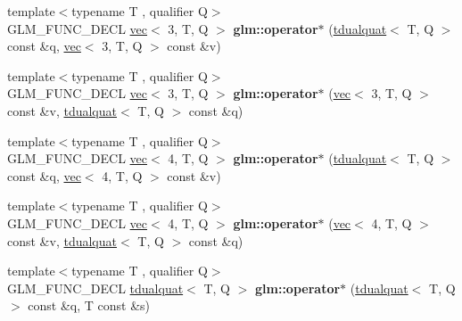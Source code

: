 \begin{DoxyCompactItemize}
{\footnotesize template$<$typename T , qualifier Q$>$ }\\G\+L\+M\+\_\+\+F\+U\+N\+C\+\_\+\+D\+E\+CL \hyperlink{structglm_1_1vec}{vec}$<$ 3, T, Q $>$ {\bfseries glm\+::operator$\ast$} (\hyperlink{structglm_1_1tdualquat}{tdualquat}$<$ T, Q $>$ const \&q, \hyperlink{structglm_1_1vec}{vec}$<$ 3, T, Q $>$ const \&v)
\item 
\mbox{\label{group__gtx__dual__quaternion_ga84dc00cb210525a28d3a185c9a0ba176}} 
{\footnotesize template$<$typename T , qualifier Q$>$ }\\G\+L\+M\+\_\+\+F\+U\+N\+C\+\_\+\+D\+E\+CL \hyperlink{structglm_1_1vec}{vec}$<$ 3, T, Q $>$ {\bfseries glm\+::operator$\ast$} (\hyperlink{structglm_1_1vec}{vec}$<$ 3, T, Q $>$ const \&v, \hyperlink{structglm_1_1tdualquat}{tdualquat}$<$ T, Q $>$ const \&q)
\item 
\mbox{\label{group__gtx__dual__quaternion_ga5e415497e00977106ec263f86b61e84c}} 
{\footnotesize template$<$typename T , qualifier Q$>$ }\\G\+L\+M\+\_\+\+F\+U\+N\+C\+\_\+\+D\+E\+CL \hyperlink{structglm_1_1vec}{vec}$<$ 4, T, Q $>$ {\bfseries glm\+::operator$\ast$} (\hyperlink{structglm_1_1tdualquat}{tdualquat}$<$ T, Q $>$ const \&q, \hyperlink{structglm_1_1vec}{vec}$<$ 4, T, Q $>$ const \&v)
\item 
\mbox{\label{group__gtx__dual__quaternion_ga9fd4e646fe49daed7aabbf0cb8736685}} 
{\footnotesize template$<$typename T , qualifier Q$>$ }\\G\+L\+M\+\_\+\+F\+U\+N\+C\+\_\+\+D\+E\+CL \hyperlink{structglm_1_1vec}{vec}$<$ 4, T, Q $>$ {\bfseries glm\+::operator$\ast$} (\hyperlink{structglm_1_1vec}{vec}$<$ 4, T, Q $>$ const \&v, \hyperlink{structglm_1_1tdualquat}{tdualquat}$<$ T, Q $>$ const \&q)
\item 
\mbox{\label{group__gtx__dual__quaternion_ga03c35eae969f074f10fa2bf473670ad7}} 
{\footnotesize template$<$typename T , qualifier Q$>$ }\\G\+L\+M\+\_\+\+F\+U\+N\+C\+\_\+\+D\+E\+CL \hyperlink{structglm_1_1tdualquat}{tdualquat}$<$ T, Q $>$ {\bfseries glm\+::operator$\ast$} (\hyperlink{structglm_1_1tdualquat}{tdualquat}$<$ T, Q $>$ const \&q, T const \&s)
\item 
\mbox{\label{group__gtx__dual__quaternion_gafbd543470cb70432624e046ab85a00e4}} 

\end{DoxyCompactItemize}
